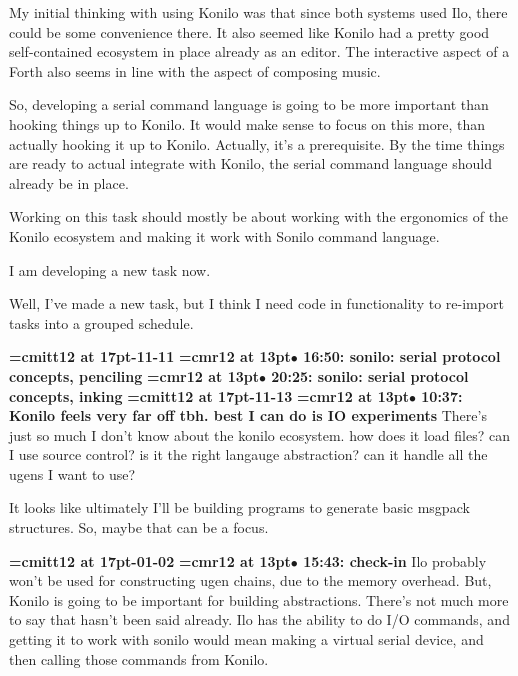 My initial thinking with using Konilo was that since both systems used Ilo, there could be some convenience there. It also seemed like Konilo had a pretty good self-contained ecosystem in place already as an editor. The interactive aspect of a Forth also seems in line with the aspect of composing music.
\par

So, developing a serial command language is going to be more important than hooking things up to Konilo. It would make sense to focus on this more, than actually hooking it up to Konilo. Actually, it's a prerequisite. By the time things are ready to actual integrate with Konilo, the serial command language should already be in place.
\par

Working on this task should mostly be about working with the ergonomics of the Konilo ecosystem and making it work with Sonilo command language.
\par

I am developing a new task now.
\par

Well, I've made a new task, but I think I need code in functionality to re-import tasks into a grouped schedule.
\par

{\medskip\noindent\bf\font\titlefont=cmitt12 at 17pt-11-11}\medskip
{\smallskip\noindent\bf\font\titlefont=cmr12 at 13pt\titlefont $\bullet$ 16:50: sonilo: serial protocol concepts, penciling}\smallskip
{\smallskip\noindent\bf\font\titlefont=cmr12 at 13pt\titlefont $\bullet$ 20:25: sonilo: serial protocol concepts, inking}\smallskip
{\medskip\noindent\bf\font\titlefont=cmitt12 at 17pt-11-13}\medskip
{\smallskip\noindent\bf\font\titlefont=cmr12 at 13pt\titlefont $\bullet$ 10:37: Konilo feels very far off tbh. best I can do is IO experiments}\smallskip
There's just so much I don't know about the konilo ecosystem. how does it load files? can I use source control? is it the right langauge abstraction? can it handle all the ugens I want to use?
\par

It looks like ultimately I'll be building programs to generate basic msgpack structures. So, maybe that can be a focus.
\par

{\medskip\noindent\bf\font\titlefont=cmitt12 at 17pt-01-02}\medskip
{\smallskip\noindent\bf\font\titlefont=cmr12 at 13pt\titlefont $\bullet$ 15:43: check-in}\smallskip
Ilo probably won't be used for constructing ugen chains, due to the memory overhead. But, Konilo is going to be important for building abstractions. There's not much more to say that hasn't been said already. Ilo has the ability to do I/O commands, and getting it to work with sonilo would mean making a virtual serial device, and then calling those commands from Konilo.
\par

